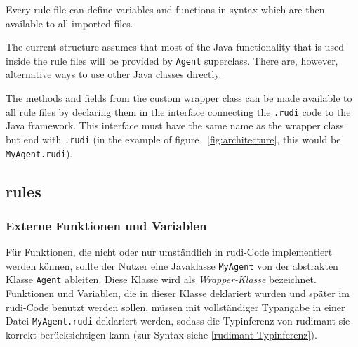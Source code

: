 Every rule file can define variables and functions in \vonda syntax which are
then available to all imported files.

The current structure assumes that most of the Java functionality that is used
inside the rule files will be provided by \texttt{Agent} superclass. There are,
however, alternative ways to use other Java classes directly.

The methods and fields from the custom wrapper class can be made available to all rule files by declaring them in the interface connecting the \texttt{.rudi} code to the Java framework. This interface must have the same name as the wrapper class but end with \texttt{.rudi} (in the example of figure ~\ref{fig:architecture}, this would be \texttt{MyAgent.rudi}).





\subsection{\vonda rules}


\subsubsection{Externe Funktionen und Variablen}
\label{rudimant-global}

Für Funktionen, die nicht oder nur umständlich in rudi-Code implementiert
werden können, sollte der Nutzer eine Javaklasse \texttt{MyAgent} von der
abstrakten Klasse \texttt{Agent} ableiten. Diese Klasse wird als
\emph{Wrapper-Klasse} bezeichnet. Funktionen und Variablen, die in
dieser Klasse deklariert wurden und später im rudi-Code benutzt werden sollen,
müssen mit vollständiger Typangabe in einer Datei \texttt{MyAgent.rudi}
deklariert werden, sodass die Typinferenz von rudimant sie korrekt
berücksichtigen kann (zur Syntax siehe \ref{rudimant-Typinferenz}).

